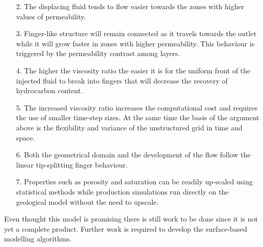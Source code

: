 \documentclass[preprint,authoryear,12pt]{elsarticle}
\begin{document}
{\begin{enumerate}
\item[2.] The displacing fluid tends to flow easier towards the zones with higher values of permeability.
\item[3.] Finger-like structure will remain connected as it travels towards the outlet while it will grow faster in zones with higher permeability. This behaviour is triggered by the permeability contrast among layers.
\item[4.] The higher the viscosity ratio the easier it is for the uniform front of the injected fluid to break into fingers that will decrease the recovery of hydrocarbon content.
\item[5.] The increased viscosity ratio increases the computational cost and requires the use of smaller time-step sizes. At the same time the basis of the argument above is the flexibility and variance of the unstructured grid in time and space.
\item[6.] Both the geometrical domain and the development of the flow follow the linear tip-splitting finger behaviour.
\item[7.] Properties such as porosity and saturation can be readily up-scaled using statistical methods while production simulations run directly on the geological model without the need to upscale.

\end{enumerate} 
}
  


\noindent Even thought this model is promising there is still work to be done since it is not yet a complete product. Further work is required to develop the surface-based modelling algorithms.


   







\pagebreak
\clearpage

%
\end{document}
